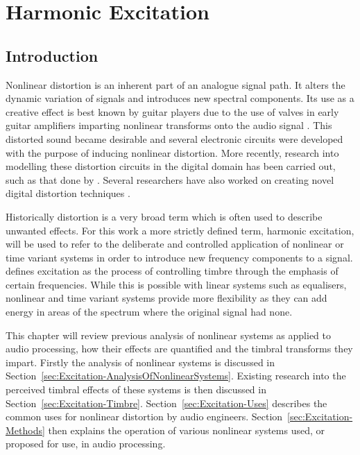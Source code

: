 \chapter{Harmonic Excitation}
\label{chap:Excitation}

\section{Introduction}
\label{sec:Excitation-Introduction}
	Nonlinear distortion is an inherent part of an analogue signal path. It alters the dynamic variation of signals and
	introduces new spectral components. Its use as a creative effect is best known by guitar players due to the use of
	valves in early guitar amplifiers imparting nonlinear transforms onto the audio signal
	\citep{dutilleux2011nonlinear}. This distorted sound became desirable and several electronic circuits were
	developed with the purpose of inducing nonlinear distortion. More recently, research into modelling these
	distortion circuits in the digital domain has been carried out, such as that done by \citet{pakarinen2009a}.
	Several researchers have also worked on creating novel digital distortion techniques
	\citep{fernandez-cid2001distortion, puckette2007patch, pekonen2008coefficient}.

	Historically distortion is a very broad term which is often used to describe unwanted effects. For this work a more
	strictly defined term, harmonic excitation, will be used to refer to the deliberate and controlled application of
	nonlinear or time variant systems in order to introduce new frequency components to a signal.
	\citet{dutilleux2011nonlinear} defines excitation as the process of controlling timbre through the emphasis of
	certain frequencies. While this is possible with linear systems such as equalisers, nonlinear and time variant
	systems provide more flexibility as they can add energy in areas of the spectrum where the original signal had
	none.

	This chapter will review previous analysis of nonlinear systems as applied to audio processing, how their effects
	are quantified and the timbral transforms they impart. Firstly the analysis of nonlinear systems is discussed in
	Section~\ref{sec:Excitation-AnalysisOfNonlinearSystems}. Existing research into the perceived timbral effects of
	these systems is then discussed in Section~\ref{sec:Excitation-Timbre}. Section~\ref{sec:Excitation-Uses} describes
	the common uses for nonlinear distortion by audio engineers. Section~\ref{sec:Excitation-Methods} then explains the
	operation of various nonlinear systems used, or proposed for use, in audio processing.

